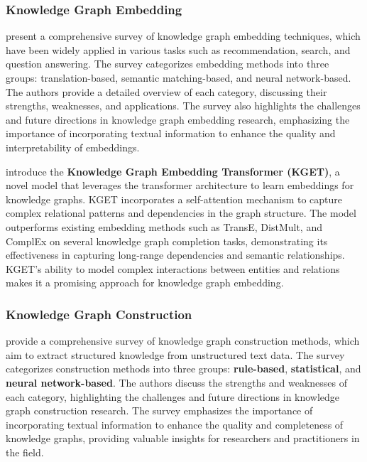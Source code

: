 \documentclass{article}
\begin{document}
\subsubsection{Knowledge Graph Embedding}

\textbf{\cite{guo2020survey}} present a comprehensive survey of knowledge graph embedding techniques, which have been widely applied in various tasks such as recommendation, search, and question answering. The survey categorizes embedding methods into three groups: translation-based, semantic matching-based, and neural network-based. The authors provide a detailed overview of each category, discussing their strengths, weaknesses, and applications. The survey also highlights the challenges and future directions in knowledge graph embedding research, emphasizing the importance of incorporating textual information to enhance the quality and interpretability of embeddings.

\textbf{\cite{zhang2021kget}} introduce the \textbf{Knowledge Graph Embedding Transformer (KGET)}, a novel model that leverages the transformer architecture to learn embeddings for knowledge graphs. KGET incorporates a self-attention mechanism to capture complex relational patterns and dependencies in the graph structure. The model outperforms existing embedding methods such as TransE, DistMult, and ComplEx on several knowledge graph completion tasks, demonstrating its effectiveness in capturing long-range dependencies and semantic relationships. KGET's ability to model complex interactions between entities and relations makes it a promising approach for knowledge graph embedding.

\subsubsection{Knowledge Graph Construction}

\textbf{\cite{ji2022survey}} provide a comprehensive survey of knowledge graph construction methods, which aim to extract structured knowledge from unstructured text data. The survey categorizes construction methods into three groups: \textbf{rule-based}, \textbf{statistical}, and \textbf{neural network-based}. The authors discuss the strengths and weaknesses of each category, highlighting the challenges and future directions in knowledge graph construction research. The survey emphasizes the importance of incorporating textual information to enhance the quality and completeness of knowledge graphs, providing valuable insights for researchers and practitioners in the field.
\end{document}
